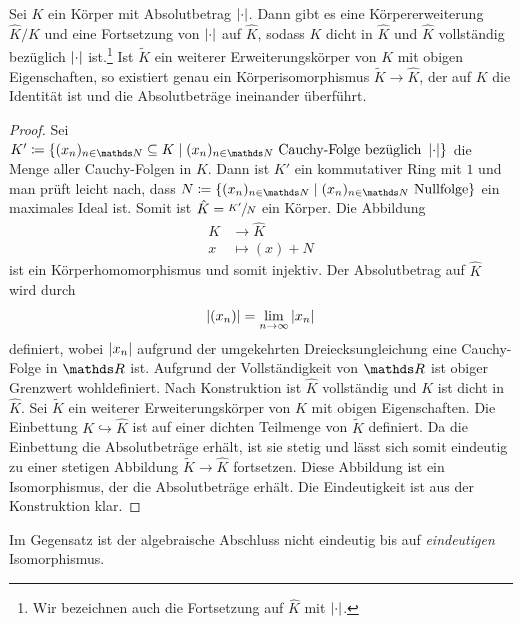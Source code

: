 \begin{satz}
Sei $K$ ein Körper mit Absolutbetrag $\left\vert\cdot\right\vert$.
Dann gibt es eine Körpererweiterung $\hat{K}/K$ und eine Fortsetzung von $\left\vert\cdot\right\vert$ auf $\hat{K}$, sodass $K$ dicht in $\hat{K}$ und $\hat{K}$ vollständig bezüglich $\left\vert\cdot\right\vert$ ist.\footnote{Wir bezeichnen auch die Fortsetzung auf $\hat{K}$ mit $\left\vert\cdot\right\vert$.}
Ist $\tilde{K}$ ein weiterer Erweiterungskörper von $K$ mit obigen Eigenschaften,
so existiert genau ein Körperisomorphismus $\tilde{K}\to \hat{K}$, der auf $K$ die Identität ist
und die Absolutbeträge ineinander überführt.
\begin{proof}
Sei $K'\coloneqq\{(x_n)_{n\in \N}\subseteq K \mid (x_n)_{n\in \N} \text{ Cauchy-Folge bezüglich } \abs{\cdot}\}$ die Menge aller Cauchy-Folgen in $K$.
Dann ist $K'$ ein kommutativer Ring mit $1$ und man prüft leicht nach, dass $N\coloneqq\{(x_n)_{n\in \N}\mid (x_n)_{n\in \N} \text{ Nullfolge}\}$
ein maximales Ideal ist.
Somit ist $\hat{K}=\sfrac{K'}{N}$ ein Körper. Die Abbildung
\begin{align*}
K &\to \hat{K}\\
x &\mapsto (x)+N
\end{align*}
ist ein Körperhomomorphismus und somit injektiv.
Der Absolutbetrag auf $\hat{K}$ wird durch
\begin{align*}
\left\vert(x_n)\right\vert=\lim_{n\to \infty} \left\vert x_n\right\vert
\end{align*}
definiert, wobei $\left\vert x_n\right\vert$ aufgrund der umgekehrten
Dreiecksungleichung eine Cauchy-Folge in $\R$ ist.
Aufgrund der Vollständigkeit von $\R$ ist obiger Grenzwert wohldefiniert.
Nach Konstruktion ist $\hat{K}$ vollständig und $K$ ist dicht in $\hat{K}$.
Sei $\tilde{K}$ ein weiterer Erweiterungskörper von $K$ mit obigen Eigenschaften.
Die Einbettung $K \hookrightarrow \hat{K}$ ist auf einer dichten Teilmenge von $\tilde{K}$ definiert.
Da die Einbettung die Absolutbeträge erhält, ist sie stetig und lässt sich somit eindeutig zu einer stetigen Abbildung $\tilde{K}\to \hat{K}$ fortsetzen.
Diese Abbildung ist ein Isomorphismus, der die Absolutbeträge erhält.
Die Eindeutigkeit ist aus der Konstruktion klar.
\end{proof}
\end{satz}

\begin{bem}
Im Gegensatz ist der algebraische Abschluss nicht eindeutig bis auf \emph{eindeutigen} Isomorphismus.
\end{bem}
